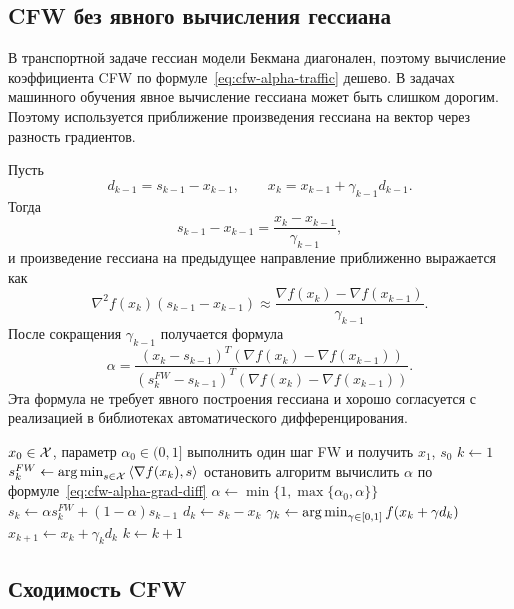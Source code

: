 \subsection{CFW без явного вычисления гессиана}

В транспортной задаче гессиан модели Бекмана диагонален, поэтому вычисление коэффициента CFW по формуле~\eqref{eq:cfw-alpha-traffic} дешево.
В задачах машинного обучения явное вычисление гессиана может быть слишком дорогим.
Поэтому используется приближение произведения гессиана на вектор через разность градиентов.

Пусть
\[
    d_{k-1}=s_{k-1}-x_{k-1},
    \qquad
    x_k=x_{k-1}+\gamma_{k-1}d_{k-1}.
\]
Тогда
\[
    s_{k-1}-x_{k-1}
    =
    \frac{x_k-x_{k-1}}{\gamma_{k-1}},
\]
и произведение гессиана на предыдущее направление приближенно выражается как
\[
    \nabla^2 f(x_k)(s_{k-1}-x_{k-1})
    \approx
    \frac{\nabla f(x_k)-\nabla f(x_{k-1})}{\gamma_{k-1}}.
\]
После сокращения $\gamma_{k-1}$ получается формула
\begin{equation}
    \alpha =
    \frac{
        (x_k-s_{k-1})^T(\nabla f(x_k)-\nabla f(x_{k-1}))
    }{
        (s_k^{FW}-s_{k-1})^T(\nabla f(x_k)-\nabla f(x_{k-1}))
    }.
    \label{eq:cfw-alpha-grad-diff}
\end{equation}
Эта формула не требует явного построения гессиана и хорошо согласуется с реализацией в библиотеках автоматического дифференцирования.

\begin{algorithm}
\caption{Conjugate Frank--Wolfe для общей гладкой задачи}
\begin{algorithmic}
\REQUIRE $x_0\in\mathcal{X}$, параметр $\alpha_0\in(0,1]$
\STATE выполнить один шаг FW и получить $x_1$, $s_0$
\STATE $k\gets 1$
\REPEAT
\STATE $s_k^{FW}\gets\operatorname*{arg\,min}_{s\in\mathcal{X}}\left\langle \nabla f(x_k), s \right\rangle$
\STATE остановить алгоритм
\ENDIF
\STATE вычислить $\alpha$ по формуле~\eqref{eq:cfw-alpha-grad-diff}
\STATE $\alpha\gets\min\{1,\max\{\alpha_0,\alpha\}\}$
\STATE $s_k\gets\alpha s_k^{FW}+(1-\alpha)s_{k-1}$
\STATE $d_k\gets s_k-x_k$
\STATE $\gamma_k\gets\operatorname*{arg\,min}_{\gamma\in[0,1]}f(x_k+\gamma d_k)$
\STATE $x_{k+1}\gets x_k+\gamma_kd_k$
\STATE $k\gets k+1$
\end{algorithmic}
\end{algorithm}

\subsection{Сходимость CFW}

